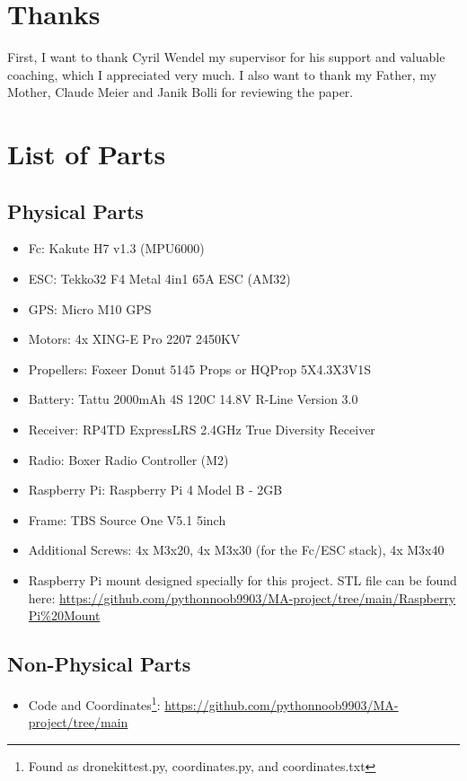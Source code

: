 \documentclass[svgnames]{article}
\begin{document}
	\section{Thanks}
	First, I want to thank Cyril Wendel my supervisor for his support and valuable coaching, which I appreciated very much. I also want to thank my Father, my Mother, Claude Meier and Janik Bolli for reviewing the paper.
	
	\section{List of Parts}
	\subsection*{Physical Parts}
	\begin{itemize}
		\item \gls{Fc}:		Kakute H7 v1.3 (MPU6000) \cite{KakuteH7}
		\item \gls{ESC}: 	Tekko32 F4 Metal 4in1 65A ESC (AM32) \cite{Tekko32}
		\item \gls{GPS}: 	Micro M10 GPS \cite{m10gps}
		\item Motors: 	4x XING-E Pro 2207 2450KV \cite{xingepro}
		\item Propellers: 	Foxeer Donut 5145 Props \cite{toroidal} or HQProp 5X4.3X3V1S \cite{hqprops}
		\item Battery: 		Tattu 2000mAh 4S 120C 14.8V R-Line Version 3.0 \cite{tattu}
		\item Receiver: 	RP4TD ExpressLRS 2.4GHz True Diversity Receiver \cite{radiomasterreceiver}
		\item Radio: 		Boxer Radio Controller (M2) \cite{radiomasterboxer}
		\item Raspberry Pi:	Raspberry Pi 4 Model B - 2GB \cite{raspberrypi}
		\item Frame:		TBS Source One V5.1 5inch \cite{frame}
		\item Additional Screws: 4x M3x20, 4x M3x30 (for the \gls{Fc}/\gls{ESC} stack), 4x M3x40
		\item Raspberry Pi mount designed specially for this project. STL file can be found here: \url{https://github.com/pythonnoob9903/MA-project/tree/main/Raspberry Pi%20Mount}
	\end{itemize}
	\subsection*{Non-Physical Parts}
	\begin{itemize}
		
		\item Code and Coordinates\footnote{Found as dronekittest.py, coordinates.py, and coordinates.txt}:  \url{https://github.com/pythonnoob9903/MA-project/tree/main}
	\end{itemize}
	
\end{document}
